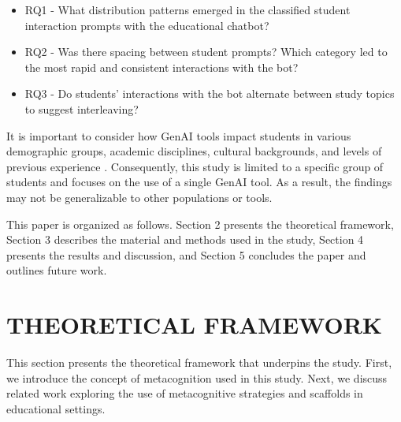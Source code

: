\documentclass[a4paper,twoside]{article}
\begin{document}
\begin{itemize}
  \item RQ1 - What distribution patterns emerged in the classified student
  interaction prompts with the educational chatbot?
  \item RQ2 - Was there spacing between student prompts? Which category led to
  the most rapid and consistent interactions with the bot?
  \item RQ3 - Do students' interactions with the bot alternate between study
  topics to suggest interleaving?
\end{itemize}


It is important to consider how GenAI tools impact students in
various demographic groups, academic disciplines, cultural backgrounds, and
levels of previous experience \citep{catalan21} \citep{neo22}. Consequently,
this study is limited to a specific group of students and focuses on the use of
a single GenAI tool. As a result, the findings may not be generalizable to other
populations or tools.

This paper is organized as follows. Section 2 presents the theoretical
framework, Section 3 describes the material and methods used in the study,
Section 4 presents the results and discussion, and Section 5 concludes the
paper and outlines future work.

\section{\uppercase{Theoretical Framework}}

This section presents the theoretical framework that underpins the study. First,
we introduce the concept of metacognition used in this study. Next, we discuss
related work exploring the use of metacognitive strategies and scaffolds
in educational settings.
\end{document}
